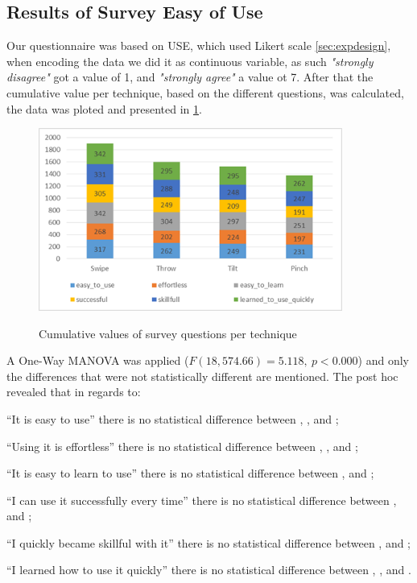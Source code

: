 \subsection{Results of Survey Easy of Use}
Our questionnaire was based on USE, which used Likert scale \ref*{sec:expdesign}, when encoding the data we did it as continuous variable, as such \emph{"strongly disagree"} got a value of 1, and \emph{"strongly agree"} a value ot 7. After that the cumulative value per technique, based on the different questions, was calculated, the data was ploted and presented in \ref{fig:surveyResult}. 
\begin{figure}[H]
	{\includegraphics[width = 1\columnwidth , height = 6cm ]{images/survey-data.png}} 
	\caption{
		Cumulative values of survey questions per technique
	}
	\label{fig:surveyResult}
\end{figure}

A One-Way MANOVA was applied ($F(18, 574.66)=5.118,\ p<0.000$) and only the differences that were not statistically different are mentioned.
The post hoc revealed that in regards to: 
\begin{enumerate*}[label=\itshape\arabic*\upshape)]
	\item{``It is easy to use'' there is no statistical difference between \throw, \tilt, and \pinch;}
	\item{``Using it is effortless'' there is no statistical difference between \throw, \tilt, and \pinch;}
	\item{``It is easy to learn to use'' there is no statistical difference between \tilt, and \throw;}
	\item{``I can use it successfully every time'' there is no statistical difference between \tilt, and \pinch;}
	\item{``I quickly became skillful with it'' there is no statistical difference between \pinch, and \tilt;}
	\item{``I learned how to use it quickly'' there is no statistical difference between \throw, \tilt, and \pinch.}
\end{enumerate*}